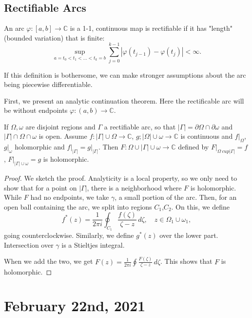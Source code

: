 \documentclass[12pt]{scrartcl}
\newcommand{\C}{\mathbb C}
\let \phi \varphi
\begin{document}
\subsection{Rectifiable Arcs}
\begin{definition}An arc $\phi:[a, b] \to \C$ is a 1-1, continuous map is rectifiable if it has "length"(bounded variation) that is finite:
$$\sup_{a = t_0 < t_1 < \dots < t_k = b} \sum_{j=0}^{k-1} |\phi(t_{j-1}) - \phi(t_j)| < \infty.$$
\end{definition}

If this definition is bothersome, we can make stronger assumptions about the arc being piecewise differentiable.

First, we present an analytic continuation theorem.  Here the rectificable arc will be without endpoints $\phi:(a, b) \to \C$.  

\begin{thm} If $\Omega, \omega$ are disjoint regions and $\Gamma$ a rectifiable arc, so that $|\Gamma| = \partial \Omega \cap \partial \omega$ and $|\Gamma| \cap \Omega \cap \omega$ is open.  Assume $f: |\Gamma| \cup \Omega \to \C$, $g; |\Omega| \cup \omega \to \C$ is continuous and $f\vert_{\Omega}$, $g \vert_\omega$ holomorphic and $f \vert_{|\Gamma|} = g \vert_{|\Gamma|}$.    Then $F: \Omega \cup |\Gamma| \cup \omega \to \C$ defined by $F\vert_{\Omega\ cup |\Gamma|} = f$, $F \vert_{|\Gamma|\cup \omega} = g$ is holomorphic.  
\end{thm}
\begin{proof}
We sketch the proof.  Analyticity is a local property, so we only need to show that for a point on $|\Gamma|$, there is a neighborhood where $F$ is holomorphic.  While $F$ had no endpoints,  we take $\gamma$, a small portion of the arc.  Then, for an open ball containing the arc, we split into regions $C_1$,$C_2$.  On this, we define 
$$f^*(z) = \frac{1}{2\pi i}\oint_{C_1} \frac{f(\zeta)}{\zeta - z}\,d\zeta, \quad z \in \Omega_1 \cup \omega_1,$$
 going counterclockwise.  Similarly, we define $g^*(z)$ over the lower part.  Intersection over $\gamma$ is a Stieltjes integral.
 
When we add the two, we get $F(z) = \frac{1}{2\pi i} \oint \frac{F(\zeta)}{\zeta - z}\,d\zeta$.  This shows that $F$ is holomorphic.  
\end{proof}
\pagebreak
\section{February 22nd, 2021}
\end{document}
